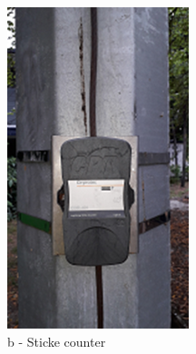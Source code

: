 \begin{figure}[!htb]
\begin{minipage}[b]{0.3\linewidth}
		\includegraphics[width=\textwidth]{figures/fig_ch04_elecaudit_visualinspection_strike_counter}
		\caption*{b - Sticke counter}
	\end{minipage}
	\hspace{0.03cm}
	\begin{minipage}[b]{0.3\linewidth}
		\centering

\end{minipage}
\end{figure}
